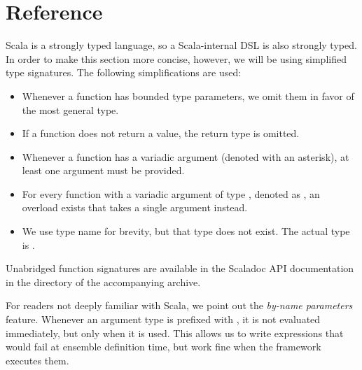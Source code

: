 \section{Reference}
\label{dsl:reference}

Scala is a strongly typed language, so a Scala-internal DSL is also strongly typed. In
order to make this section more concise, however, we will be using simplified type
signatures. The following simplifications are used:

\begin{itemize}
\item Whenever a function has bounded type parameters, we omit them in favor of the most
general type.
\item If a function does not return a value, the return type  is omitted.
\item Whenever a function has a variadic argument (denoted with an asterisk), at least
one argument must be provided.
\item For every function with a variadic argument of type , denoted as ,
an overload exists that takes a single  argument instead.
\item We use type name  for brevity, but that type does not exist. The actual
type is .
\end{itemize}

Unabridged function signatures are available in the Scaladoc API documentation in the
 directory of the accompanying archive.

\medskip

For readers not deeply familiar with Scala, we point out the \textit{by-name parameters}
feature. Whenever an argument type is prefixed with \dop{=>}, it is not evaluated
immediately, but only when it is used. This allows us to write expressions that would
fail at ensemble definition time, but work fine when the framework executes them.


\newenvironment{dslsig}%
    {%
        \par\vspace{0.6em}\bfseries\ttfamily\raggedright
    }%
    {%
        \vspace{-0.2em}
    }%

\newenvironment{dsldesc}%
    {%
        \nopagebreak
        \setlength{\parindent}{0em}
        \setlength{\parskip}{0.3em}
        \begin{adjustwidth}{1cm}{}
    }%
    {%
        \end{adjustwidth}
    }%

